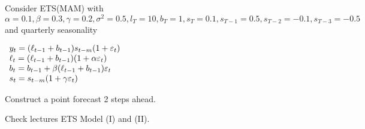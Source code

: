 
\begin{question}
Consider ETS(MAM) with \(\alpha=0.1, \beta=0.3, \gamma=0.2, \sigma^2=0.5, l_T = 10, b_T = 1, s_{T} = 0.1, s_{T-1} = 0.5, s_{T-2} = -0.1, s_{T-3} = -0.5\) and quarterly seasonality

\(\begin{array}{l c r}{{y_{t}=(\ell_{t-1}+b_{t-1})s_{t-m}(1+\varepsilon_{t})}}\\ {{\ell_{t}=(\ell_{t-1}+b_{t-1})(1+\alpha\varepsilon_{t})}}\\ {{b_{t}=b_{t-1}+\beta(\ell_{t-1}+b_{t-1})\varepsilon_{t}}}\\ {{s_{t}=s_{t-m}(1+\gamma\varepsilon_{t})}}\end{array}\)

Construct a point forecast 2 steps ahead.
\end{question}

\begin{solution}
Check lectures ETS Model (I) and (II).
\end{solution}

